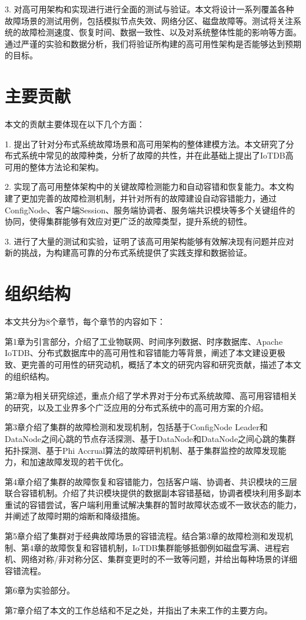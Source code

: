 3. 对高可用架构和实现进行进行全面的测试与验证。本文将设计一系列覆盖各种故障场景的测试用例，包括模拟节点失效、网络分区、磁盘故障等。测试将关注系统的故障检测速度、恢复时间、数据一致性、以及对系统整体性能的影响等方面。通过严谨的实验和数据分析，我们将验证所构建的高可用性架构是否能够达到预期的目标。



\section{主要贡献}

本文的贡献主要体现在以下几个方面：

1. 提出了针对分布式系统故障场景和高可用架构的整体建模方法。本文研究了分布式系统中常见的故障种类，分析了故障的共性，并在此基础上提出了IoTDB高可用的整体方法论和架构。


2. 实现了高可用整体架构中的关键故障检测能力和自动容错和恢复能力。本文构建了更加完善的故障检测机制，并针对所有的故障建设自动容错能力，通过ConfigNode、客户端Session、服务端协调者、服务端共识模块等多个关键组件的协同，使得集群能够有效应对更广泛的故障类型，提升系统的韧性。


3. 进行了大量的测试和实验，证明了该高可用架构能够有效解决现有问题并应对新的挑战，为构建高可靠的分布式系统提供了实践支撑和数据验证。


\section{组织结构}
本文共分为8个章节，每个章节的内容如下：

第1章为引言部分，介绍了工业物联网、时间序列数据、时序数据库、Apache IoTDB、分布式数据库中的高可用性和容错能力等背景，阐述了本文建设更极致、更完善的可用性的研究动机，概括了本文的研究内容和研究贡献，描述了本文的组织结构。

第2章为相关研究综述，重点介绍了学术界对于分布式系统故障、高可用容错相关的研究，以及工业界多个广泛应用的分布式系统中的高可用方案的介绍。

第3章介绍了集群的故障检测和发现机制，包括基于ConfigNode Leader和DataNode之间心跳的节点存活探测、基于DataNode和DataNode之间心跳的集群拓扑探测、基于Phi Accrual算法的故障研判机制、基于集群监控的故障发现能力，和加速故障发现的若干优化。

第4章介绍了集群的故障恢复和容错能力，包括客户端、协调者、共识模块的三层联合容错机制。介绍了共识模块提供的数据副本容错基础，协调者模块利用多副本重试的容错尝试，客户端利用重试解决集群的暂时故障状态或不一致状态的能力，并阐述了故障时期的熔断和降级措施。

第5章介绍了集群对于经典故障场景的容错流程。结合第3章的故障检测和发现机制、第4章的故障恢复和容错机制，IoTDB集群能够抵御例如磁盘写满、进程宕机、网络对称/非对称分区、集群变更时的不一致等问题，并给出每种场景的详细容错流程。

第6章为实验部分。

第7章介绍了本文的工作总结和不足之处，并指出了未来工作的主要方向。